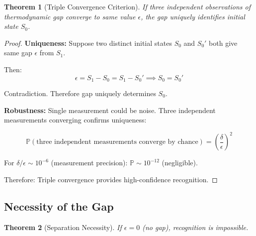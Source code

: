 \documentclass[twocolumn,10pt]{article}
\newtheorem{theorem}{Theorem}[section]
\theoremstyle{definition}
\theoremstyle{remark}
\begin{document}
\begin{theorem}[Triple Convergence Criterion]
\label{thm:triple_convergence}
If three independent observations of thermodynamic gap converge to same value $\epsilon$, the gap uniquely identifies initial state $S_0$.
\end{theorem}

\begin{proof}
\textbf{Uniqueness:} Suppose two distinct initial states $S_0$ and $S_0'$ both give same gap $\epsilon$ from $S_1$.

Then:
\begin{equation}
\epsilon = S_1 - S_0 = S_1 - S_0' \implies S_0 = S_0'
\end{equation}

Contradiction. Therefore gap uniquely determines $S_0$.

\vspace{0.2cm}
\noindent\textbf{Robustness:} Single measurement could be noise. Three independent measurements converging confirms uniqueness:

\begin{equation}
\mathbb{P}(\text{three independent measurements converge by chance}) = \left(\frac{\delta}{\epsilon}\right)^2
\end{equation}

For $\delta/\epsilon \sim 10^{-6}$ (measurement precision): $\mathbb{P} \sim 10^{-12}$ (negligible).

Therefore: Triple convergence provides high-confidence recognition.
\end{proof}

\subsection{Necessity of the Gap}

\begin{theorem}[Separation Necessity]
\label{thm:separation_necessity}
If $\epsilon = 0$ (no gap), recognition is impossible.
\end{theorem}
\end{document}
